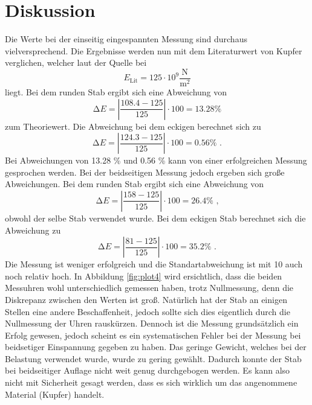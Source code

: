 \section{Diskussion}
\label{sec:Diskussion}
Die Werte bei der einseitig eingespannten Messung sind durchaus vielversprechend.
Die Ergebnisse werden nun mit dem Literaturwert von Kupfer verglichen, welcher laut der Quelle {\cite{demtroeder1}} bei
\begin{equation*}
  E_\text{Lit} = 125 \cdot 10^9 \frac{\unit\newton}{\unit\meter^2}
\end{equation*}
liegt. Bei dem runden Stab ergibt sich eine Abweichung von
\begin{equation*}
  \increment E = \left|\frac{108.4 - 125}{125}\right| \cdot 100 = 13.28 \%
\end{equation*}
zum Theoriewert.
Die Abweichung bei dem eckigen berechnet sich zu
\begin{equation*}
    \increment E = \left|\frac{124.3 - 125}{125}\right| \cdot 100 = 0.56 \% \text{ .}
\end{equation*}
Bei Abweichungen von 13.28 \% und 0.56 \% kann von einer erfolgreichen Messung gesprochen werden.
Bei der beidseitigen Messung jedoch ergeben sich große Abweichungen.
Bei dem runden Stab ergibt sich eine Abweichung von 
\begin{equation*}
    \increment E = \left|\frac{158 - 125}{125}\right| \cdot 100 = 26.4 \% \text{ ,}
\end{equation*}
obwohl der selbe Stab verwendet wurde.
Bei dem eckigen Stab berechnet sich die Abweichung zu
\begin{equation*}
    \increment E = \left|\frac{81 - 125}{125}\right| \cdot 100 = 35.2 \% \text{ .}
  \end{equation*}
Die Messung ist weniger erfolgreich und die Standartabweichung ist mit 10 auch noch relativ hoch.
In Abbildung \ref{fig:plot4} wird ersichtlich, dass die beiden Messuhren wohl unterschiedlich gemessen haben,
trotz Nullmessung, denn die Diskrepanz zwischen den Werten ist groß.
Natürlich hat der Stab an einigen Stellen eine andere Beschaffenheit, jedoch sollte sich
dies eigentlich durch die Nullmessung der Uhren rauskürzen.
Dennoch ist die Messung grundsätzlich ein Erfolg gewesen, jedoch scheint es ein systematischen
Fehler bei der Messung bei beidsetiger Einspannung gegeben zu haben.
Das geringe Gewicht, welches bei der Belastung verwendet wurde, wurde zu gering gewählt.
Dadurch konnte der Stab bei beidseitiger Auflage nicht weit genug durchgebogen werden.
Es kann also nicht mit Sicherheit gesagt werden, dass es sich wirklich um das 
angenommene Material (Kupfer) handelt.